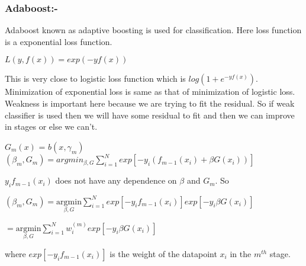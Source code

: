 \documentclass[twoside]{article}
\begin{document}
\subsubsection*{Adaboost:-}
Adaboost known as adaptive boosting is used for classification. Here loss function is a exponential loss function.
\begin{center}
$ L(y, f(x)) = exp(-yf(x))$
\end{center}
This is very close to logistic loss function which is $log(1 + e^{-yf(x)})$. Minimization of exponential loss is same as that of minimization of logistic loss.\\
Weakness is important here because we are trying to fit the residual. So if weak classifier is used then we will have some residual to fit and then we can improve in stages or else we can't.\\
\begin{center}
$G_{m}(x)$ = $b(x, \gamma_{m})$ \\
$(\beta_{m}, G_{m}) = argmin_{\beta, G} \sum\limits_{i=1}^N exp[-y_{i}(f_{m-1}(x_{i}) + \beta G(x_i))]$
\end{center}

$ y_{i}f_{m-1}(x_{i})$ does not have any dependence on $\beta$ and $G_{m}$. So 
\begin{center}
$(\beta_{m}, G_{m}) = \underset{\beta, G}{\text{argmin}} \sum\limits_{i=1}^N exp[-y_{i}f_{m-1}(x_{i})]exp[-y_{i}\beta G(x_i)]$ 

$ = \underset{\beta, G}{\text{argmin}} \sum\limits_{i=1}^N w_{i}^{(m)}exp[-y_{i}\beta G(x_i)]$
\end{center}
where $exp[-y_{i}f_{m-1}(x_{i})]$ is the weight of the datapoint $x_{i}$ in the $m^{th}$ stage.
\end{document}
